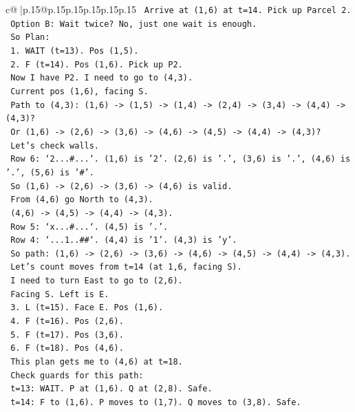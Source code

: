 \documentclass{article}
\begin{document}
{\begin{supertabular}{c@{$\;$}|p{.15\linewidth}@{}p{.15\linewidth}p{.15\linewidth}p{.15\linewidth}p{.15\linewidth}p{.15\linewidth}}
{{{\texttt{     Arrive at (1,6) at t=14. Pick up Parcel 2.} \\
\texttt{   Option B: Wait twice? No, just one wait is enough.} \\
\texttt{   So Plan:} \\
\texttt{   1. WAIT (t=13). Pos (1,5).} \\
\texttt{   2. F (t=14). Pos (1,6). Pick up P2.} \\
\texttt{   Now I have P2. I need to go to (4,3).} \\
\texttt{   Current pos (1,6), facing S.} \\
\texttt{   Path to (4,3): (1,6) {-}> (1,5) {-}> (1,4) {-}> (2,4) {-}> (3,4) {-}> (4,4) {-}> (4,3)?} \\
\texttt{   Or (1,6) {-}> (2,6) {-}> (3,6) {-}> (4,6) {-}> (4,5) {-}> (4,4) {-}> (4,3)?} \\
\texttt{   Let's check walls.} \\
\texttt{   Row 6: `2...\#...`. (1,6) is '2'. (2,6) is '.', (3,6) is '.', (4,6) is '.', (5,6) is '\#'.} \\
\texttt{   So (1,6) {-}> (2,6) {-}> (3,6) {-}> (4,6) is valid.} \\
\texttt{   From (4,6) go North to (4,3).} \\
\texttt{   (4,6) {-}> (4,5) {-}> (4,4) {-}> (4,3).} \\
\texttt{   Row 5: `x...\#...`. (4,5) is '.'.} \\
\texttt{   Row 4: `...1..\#\#`. (4,4) is '1'. (4,3) is 'y'.} \\
\texttt{   So path: (1,6) {-}> (2,6) {-}> (3,6) {-}> (4,6) {-}> (4,5) {-}> (4,4) {-}> (4,3).} \\
\texttt{   Let's count moves from t=14 (at 1,6, facing S).} \\
\texttt{   I need to turn East to go to (2,6).} \\
\texttt{   Facing S. Left is E.} \\
\texttt{   3. L (t=15). Face E. Pos (1,6).} \\
\texttt{   4. F (t=16). Pos (2,6).} \\
\texttt{   5. F (t=17). Pos (3,6).} \\
\texttt{   6. F (t=18). Pos (4,6).} \\
\texttt{   This plan gets me to (4,6) at t=18.} \\
\texttt{   Check guards for this path:} \\
\texttt{   t=13: WAIT. P at (1,6). Q at (2,8). Safe.} \\
\texttt{   t=14: F to (1,6). P moves to (1,7). Q moves to (3,8). Safe.} \\
}}}
\end{supertabular}}
\end{document}
